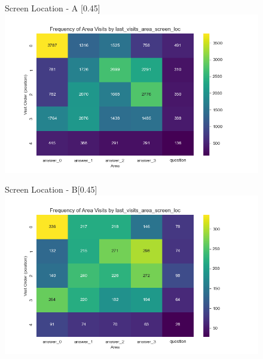 \documentclass{article}
\begin{document}
\begin{figure}[H]
  \centering
  \begin{subcaptionbox}{Screen Location - A \label{fig:sl_a}}[0.45\textwidth]
    {\centering\includegraphics[width=\linewidth]{plots/visits/matrix__last_visits_area_screen_loc_gatherers_A.png}}
  \end{subcaptionbox}
  \hfill
  \begin{subcaptionbox}{Screen Location - B\label{fig:sl_b}}[0.45\textwidth]
    {\centering\includegraphics[width=\linewidth]{plots/visits/matrix__last_visits_area_screen_loc_gatherers_B.png}}
  \end{subcaptionbox}
  
  \vspace{0.5em} %


\end{figure}
\end{document}
